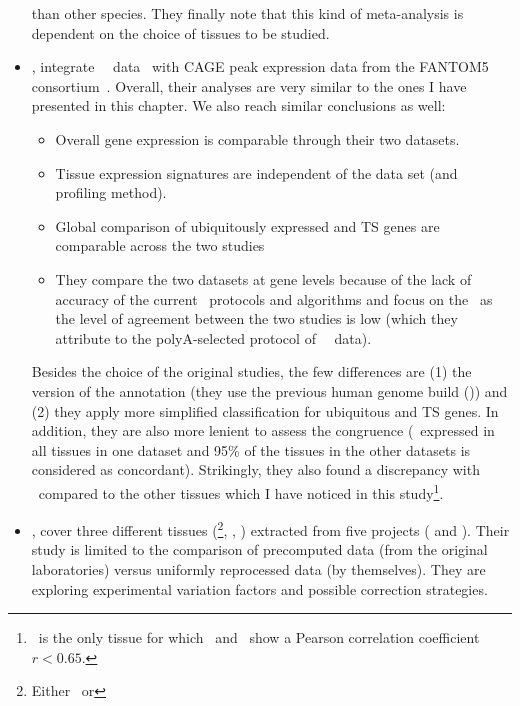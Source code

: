 \begin{itemize}[topsep=0pt,nosep]
than other species.
They finally note that this kind of meta-analysis is dependent on
the choice of tissues to be studied.
\item\hspace{-1mm}, integrate \uhlen\ \etal\ data~
with \gls{CAGE} peak expression data from the \gls{FANTOM5}
consortium~.
Overall, their analyses are very similar to the ones I have presented in this
chapter.
We also reach similar conclusions as well:
\begin{itemize}[nosep,topsep=0pt]
\item Overall gene expression is comparable through their two datasets.
\item Tissue expression signatures are independent of the data set (and profiling method).
\item Global comparison of ubiquitously expressed and \gls{TS} genes are comparable
    across the two studies
\item They compare the two datasets at gene levels because of the lack of accuracy
    of the current \Rnaseq\ protocols and algorithms and focus on the \pcgs\
    as the level of agreement between the two studies is low
    (which they attribute to the polyA-selected protocol of \uhlen\ \etal\ data).
\end{itemize}
Besides the choice of the original studies,
the few differences are (1) the version of the annotation
(they use the previous human genome build ()) and
(2) they apply more simplified classification for ubiquitous and \gls{TS} genes.
In addition, they are also more lenient to assess the congruence
(\eg\ expressed in all tissues
in one dataset and 95\% of the tissues in the other datasets is considered as
concordant).
Strikingly, they also found a discrepancy with \salivary\ compared to the other tissues
which I have noticed in this study\footnote{\salivary\
is the only tissue for which \uhlen\ and \gtex\ show a Pearson correlation coefficient
$r<0.65$.}.
\item\hspace{-1mm}, cover three different tissues
(\brain{}\footnote{Either \cortex\ or \hypothalamus}, \heart, \kidney)
extracted from five projects (\cite{Burge,VTpaper,Uhlen2015,Krupp2012} and \ibm).
Their study is limited to
the comparison of precomputed data (from the original laboratories)
versus uniformly reprocessed data (by themselves).
They are exploring experimental variation factors and possible correction strategies.

\end{itemize}
